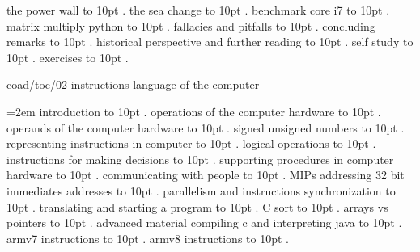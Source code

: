  the power wall \leaders\hbox to 10pt {\hss.\hss}  \hfill {}
 the sea change \leaders\hbox to 10pt {\hss.\hss}  \hfill {}
 benchmark core i7 \leaders\hbox to 10pt {\hss.\hss}  \hfill {}
 matrix multiply python \leaders\hbox to 10pt {\hss.\hss}  \hfill {}
 fallacies and pitfalls \leaders\hbox to 10pt {\hss.\hss}  \hfill {}
 concluding remarks \leaders\hbox to 10pt {\hss.\hss}  \hfill {}
 historical perspective and further reading \leaders\hbox to 10pt {\hss.\hss}  \hfill {}
 self study \leaders\hbox to 10pt {\hss.\hss}  \hfill {}
 exercises \leaders\hbox to 10pt {\hss.\hss}  \hfill {}
\smallskip
\par\endgroup
\bigskip
{}
coad/toc/02 instructions language of the computer
\par\begingroup
\leftskip=2em
\smallskip
{} introduction \leaders\hbox to 10pt {\hss.\hss}  \hfill {}
 operations of the computer hardware \leaders\hbox to 10pt {\hss.\hss}  \hfill {}
 operands of the computer hardware \leaders\hbox to 10pt {\hss.\hss}  \hfill {}
 signed unsigned numbers \leaders\hbox to 10pt {\hss.\hss}  \hfill {}
 representing instructions in computer \leaders\hbox to 10pt {\hss.\hss}  \hfill {}
 logical operations \leaders\hbox to 10pt {\hss.\hss}  \hfill {}
 instructions for making decisions \leaders\hbox to 10pt {\hss.\hss}  \hfill {}
 supporting procedures in computer hardware \leaders\hbox to 10pt {\hss.\hss}  \hfill {}
 communicating with people \leaders\hbox to 10pt {\hss.\hss}  \hfill {}
 MIPs addressing 32 bit immediates addresses \leaders\hbox to 10pt {\hss.\hss}  \hfill {}
 parallelism and instructions synchronization \leaders\hbox to 10pt {\hss.\hss}  \hfill {}
 translating and starting a program \leaders\hbox to 10pt {\hss.\hss}  \hfill {}
 C sort \leaders\hbox to 10pt {\hss.\hss}  \hfill {}
 arrays vs pointers \leaders\hbox to 10pt {\hss.\hss}  \hfill {}
 advanced material compiling c and interpreting java \leaders\hbox to 10pt {\hss.\hss}  \hfill {}
 armv7 instructions \leaders\hbox to 10pt {\hss.\hss}  \hfill {}
 armv8 instructions \leaders\hbox to 10pt {\hss.\hss}  \hfill {}
